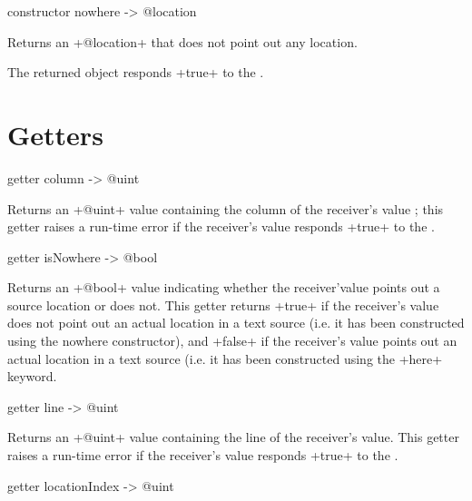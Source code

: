 
\begin{galgas}
constructor nowhere -> @location
\end{galgas}


Returns an \ggs+@location+ that does not point out any location.

The returned object responds \ggs+true+ to the .





\section{Getters}


\begin{galgas}
getter column -> @uint
\end{galgas}

Returns an \ggs+@uint+ value containing the column of the receiver's value ; this getter raises a run-time error if the receiver's value responds \ggs+true+ to the .



\begin{galgas}
getter isNowhere -> @bool
\end{galgas}

Returns an \ggs+@bool+ value indicating whether the receiver'value points out a source location or does not. This getter returns \ggs+true+ if the receiver's value does not point out an actual location in a text source (i.e. it has been constructed using the nowhere constructor), and \ggs+false+ if the receiver's value points out an actual location in a text source (i.e. it has been constructed using the \ggs+here+ keyword.



\begin{galgas}
getter line -> @uint
\end{galgas}

Returns an \ggs+@uint+ value containing the line of the receiver's value. This getter raises a run-time error if the receiver's value responds \ggs+true+ to the .



\begin{galgas}
getter locationIndex -> @uint
\end{galgas}

